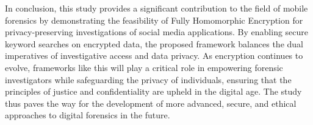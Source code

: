 \documentclass[conference]{IEEEtran}
\begin{document}
In conclusion, this study provides a significant contribution to the field of mobile forensics by demonstrating the feasibility of Fully Homomorphic Encryption for privacy-preserving investigations of social media applications. By enabling secure keyword searches on encrypted data, the proposed framework balances the dual imperatives of investigative access and data privacy. As encryption continues to evolve, frameworks like this will play a critical role in empowering forensic investigators while safeguarding the privacy of individuals, ensuring that the principles of justice and confidentiality are upheld in the digital age. The study thus paves the way for the development of more advanced, secure, and ethical approaches to digital forensics in the future.

\section*{}
\end{document}
